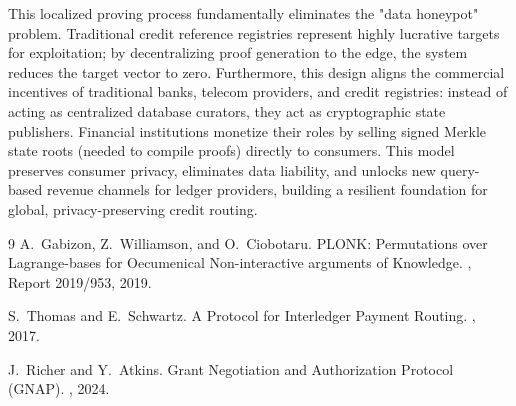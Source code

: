\documentclass[12pt]{article}
\begin{document}
This localized proving process fundamentally eliminates the "data honeypot" problem. Traditional credit reference registries represent highly lucrative targets for exploitation; by decentralizing proof generation to the edge, the system reduces the target vector to zero. Furthermore, this design aligns the commercial incentives of traditional banks, telecom providers, and credit registries: instead of acting as centralized database curators, they act as cryptographic state publishers. Financial institutions monetize their roles by selling signed Merkle state roots (needed to compile proofs) directly to consumers. This model preserves consumer privacy, eliminates data liability, and unlocks new query-based revenue channels for ledger providers, building a resilient foundation for global, privacy-preserving credit routing.

\begin{thebibliography}{9}
A.~Gabizon, Z.~Williamson, and O.~Ciobotaru.
\newblock PLONK: Permutations over Lagrange-bases for Oecumenical Non-interactive arguments of Knowledge.
, Report 2019/953, 2019.

S.~Thomas and E.~Schwartz.
\newblock A Protocol for Interledger Payment Routing.
, 2017.

J.~Richer and Y.~Atkins.
\newblock Grant Negotiation and Authorization Protocol (GNAP).
, 2024.
\end{thebibliography}
\end{document}
